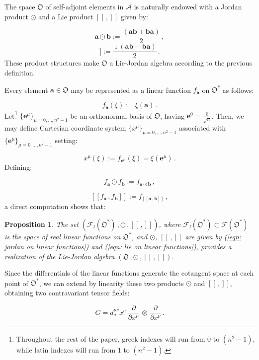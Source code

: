 \documentclass[11pt]{article}
\newcommand{\be}{\begin{equation}}
\newcommand{\ee}{\end{equation}}
\newcommand{\appa}{\mathcal{A}}
\newcommand{\obsp}{\mathfrak{O}}
\newtheorem{prop}{Proposition}
\begin{document}
The space $\obsp$ of self-adjoint elements in $\appa$ is naturally endowed with a Jordan  product $\odot$ and a Lie product $[[\,,]]$ given by:

\be
\mathbf{a}\odot\mathbf{b}:=\frac{(\mathbf{ab} + \mathbf{ba})}{2}\,,
\ee
\be
[[\mathbf{a}\,,\mathbf{b}]]:=\frac{\imath(\mathbf{ab} - \mathbf{ba})}{2}\,.
\ee
These product structures make $\obsp$ a Lie-Jordan algebra according to the previous definition.


Every element $\mathbf{a}\in\obsp$ may be represented as a linear function $f_{\mathbf{a}}$ on $\obsp^{*}$ as follows:

\be
f_{\mathbf{a}}(\xi):=\xi(\mathbf{a})\,.
\ee
Let\footnote{Throughout the rest of the paper, greek indexes will run from $0$ to $(n^{2}-1)$, while latin indexes will run from $1$ to $(n^{2}-1)$.} $\{\mathbf{e}^{\mu}\}_{\mu=0,...,n^{2}-1}$ be an orthonormal basis of $\obsp$, having $\mathbf{e}^{0}=\frac{\mathbb{I}}{\sqrt{n}}$. 
Then, we may define Cartesian coordinate system $\{x^{\mu}\}_{\mu=0,...,n^{2}-1}$ associated with $\{\mathbf{e}^{\mu}\}_{\mu=0,...,n^{2}-1}$ setting:

\be
x^{\mu}(\xi):=f_{\mathbf{e}^{\mu}}(\xi)=\xi(\mathbf{e}^{\mu})\,.
\ee
Defining:

\be\label{eqn: jordan on linear functions}
f_{\mathbf{a}}\odot f_{\mathbf{b}}:=f_{\mathbf{a}\odot\mathbf{b}}\,,
\ee

\be\label{eqn: lie on linear functions}
[[f_{\mathbf{a}}\,,f_{\mathbf{b}}]]:=f_{[[\mathbf{a}\,,\mathbf{b}]]}\,,
\ee
a direct computation shows that:

\begin{prop}
The set $(\mathcal{F}_{l}(\obsp^{*})\,,\odot\,,[[\,,]])$, where $\mathcal{F}_{l}(\obsp^{*})\subset\mathcal{F}(\obsp^{*})$ is the space of real linear functions on $\obsp^{*}$, and $\odot$, $[[\,,]]$ are given by (\ref{eqn: jordan on linear functions}) and (\ref{eqn: lie on linear functions}), provides a realization of the Lie-Jordan algebra $(\obsp\,,\odot\,,[[\,,]])$.
\end{prop}






Since the differentials of the linear functions generate the cotangent space at each point of $\obsp^{*}$, we can extend by linearity these two products $\odot$ and $[[\,, ]]$,  obtaining two contravariant tensor fields:

\be\label{eqn: G}
G= d^{\mu\nu}_{\sigma}x^{\sigma}\,\frac{\partial}{\partial x^{\mu}}\,\otimes\,\frac{\partial}{\partial x^{\nu}}\,.
\ee
\end{document}
